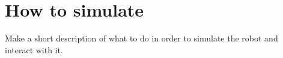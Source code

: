 \section{How to simulate} %
\label{sec:how_to_simulate}
Make a short description of what to do in order to simulate the robot and interact with it.

